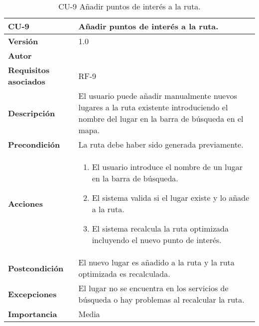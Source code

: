 \begin{table}[p]
	\centering
	\begin{tabularx}{\linewidth}{ p{} p{} }
		\toprule
		\textbf{CU-9}    & \textbf{Añadir puntos de interés a la ruta.}\\
		\toprule
		\textbf{Versión}              & 1.0    \\
		\textbf{Autor}                & \autor \\
		\textbf{Requisitos asociados} & RF-9 \\
		\textbf{Descripción}          & El usuario puede añadir manualmente nuevos lugares a la ruta existente introduciendo el nombre del lugar en la barra de búsqueda en el mapa. \\
		\textbf{Precondición}         & La ruta debe haber sido generada previamente. \\
		\textbf{Acciones}             &
		\begin{enumerate}
			\def\labelenumi{\arabic{enumi}.}
			\tightlist
			\item El usuario introduce el nombre de un lugar en la barra de búsqueda.
			\item El sistema valida si el lugar existe y lo añade a la ruta.
			\item El sistema recalcula la ruta optimizada incluyendo el nuevo punto de interés.
		\end{enumerate}\\
		\textbf{Postcondición}        & El nuevo lugar es añadido a la ruta y la ruta optimizada es recalculada. \\
		\textbf{Excepciones}          & El lugar no se encuentra en los servicios de búsqueda o hay problemas al recalcular la ruta. \\
		\textbf{Importancia}          & Media \\
		\bottomrule
	\end{tabularx}
	\caption{CU-9 Añadir puntos de interés a la ruta.}
\end{table}

